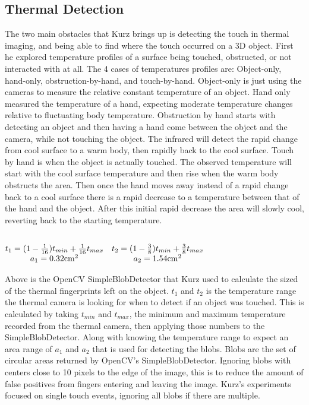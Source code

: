 \documentclass{sig-alternate}
\begin{document}


\subsection{Thermal Detection}
\label{Thermal Detection}
The two main obstacles that Kurz brings up is detecting the touch in thermal imaging, and being able to find where the touch occurred on a 3D object. First he explored temperature profiles of a surface being touched, obstructed, or not interacted with at all. The 4 cases of temperatures profiles are: Object-only, hand-only, obstruction-by-hand, and touch-by-hand. Object-only is just using the cameras to measure the relative constant temperature of an object. Hand only measured the temperature of a hand, expecting moderate temperature changes relative to fluctuating body temperature. Obstruction by hand starts with detecting an object and then having a hand come between the object and the camera, while not touching the object. The infrared will detect the rapid change from cool surface to a warm body, then rapidly back to the cool surface. Touch by hand is when the object is actually touched. The observed temperature  will start with the cool surface temperature and then rise when the warm body obstructs the area. Then once the hand moves away instead of a rapid change back to a cool surface there is a rapid decrease to a temperature between that of the hand and the object. After this initial rapid decrease the area will slowly cool, reverting back to the starting temperature. 
 

\(
\begin{matrix} \\
 t_{1}=(1-{1\over 16})t_{ min}+{1\over 16}t_{ max} & t_{2}=(1-{3\over 8})t_{ min}+{3\over 8}t_{ max}\cr a_{1}=0.32{\rm cm}^{2} & a_{2}=1.54{\rm cm}^{2}
 \end{matrix} \\\\
\)


Above is the OpenCV SimpleBlobDetector that Kurz used to calculate the sized of the thermal fingerprints left on the object. \(t_1\) and \(t_2\) is the temperature range the thermal camera is looking for when to detect if an object was touched. This is calculated by taking \(t_{min}\) and \(t_{max}\), the minimum and maximum temperature recorded from the thermal camera, then applying those numbers to the SimpleBlobDetector. Along with knowing the temperature range to expect an area range of \(a_1\) and \(a_2\) that is used for detecting the blobs. Blobs are the set of circular areas returned by OpenCV's SimpleBlobDetector. Ignoring blobs with centers close to 10 pixels to the edge of the image, this is to reduce the amount of false positives from fingers entering and leaving the image. Kurz's experiments focused on single touch events, ignoring all blobs if there are multiple.
\end{document}
